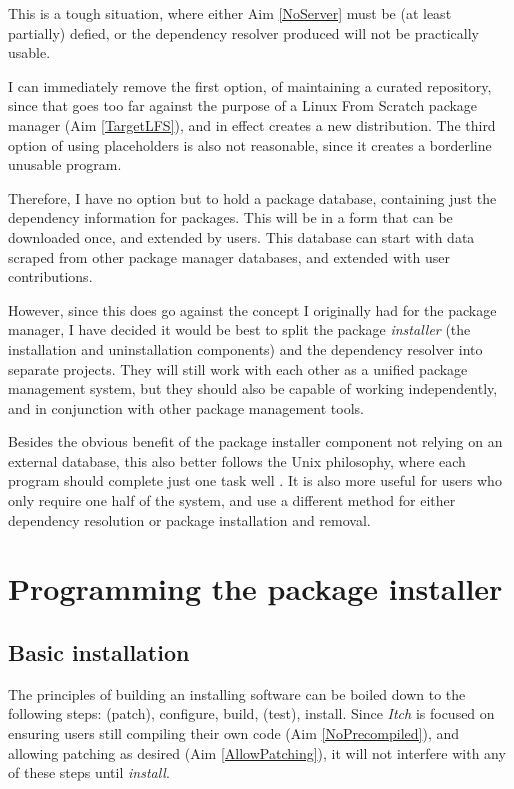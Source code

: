 \documentclass[10pt]{article}
\begin{document}
This is a tough situation, where either Aim \ref{NoServer} must be (at least partially) defied, or the dependency resolver produced will not be practically usable.

I can immediately remove the first option, of maintaining a curated repository, since that goes too far against the purpose of a Linux From Scratch package manager (Aim \ref{TargetLFS}), and in effect creates a new distribution. The third option of using placeholders is also not reasonable, since it creates a borderline unusable program. 

Therefore, I have no option but to hold a package database, containing just the dependency information for packages. This will be in a form that can be downloaded once, and extended by users. This database can start with data scraped from other package manager databases, and extended with user contributions. 

However, since this does go against the concept I originally had for the package manager, I have decided it would be best to split the package \textit{installer} (the installation and uninstallation components) and the dependency resolver into separate projects. They will still work with each other as a unified package management system, but they should also be capable of working independently, and in conjunction with other package management tools. 

Besides the obvious benefit of the package installer component not relying on an external database, this also better follows the Unix philosophy, where each program should complete just one task well \cite{UnixPhilosophy}. It is also more useful for users who only require one half of the system, and use a different method for either dependency resolution or package installation and removal. 

\section{Programming the package installer}

\subsection{Basic installation}

The principles of building an installing software can be boiled down to the following steps: (patch), configure, build, (test), install. Since \textit{Itch} is focused on ensuring users still compiling their own code (Aim \ref{NoPrecompiled}), and allowing patching as desired (Aim \ref{AllowPatching}), it will not interfere with any of these steps until \textit{install}.
\end{document}
